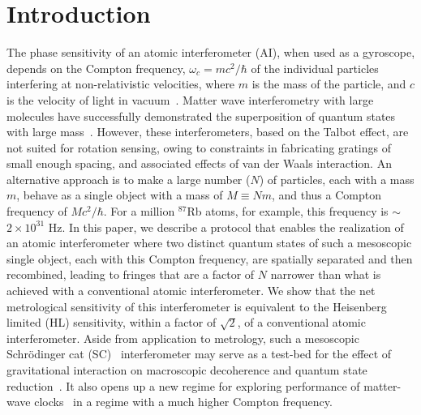 \documentclass[aps,pra,letterpaper,superscriptaddress,showpacs,amsmath,floats,twocolumn]{revtex4-1}
\begin{document}

\section{Introduction}
\label{Introduction}
The phase sensitivity of an atomic interferometer (AI), when used as a gyroscope, depends on the Compton frequency, $\omega_c = mc^2/\hbar$ of the individual particles interfering at non-relativistic velocities, where $m$ is the mass of the particle, and $c$ is the velocity of light in vacuum~\cite{Borde, Chu, Riehle, RefComment}. Matter wave interferometry with large molecules have successfully demonstrated the superposition of quantum states with large mass~\cite{Eibenberger}. However, these interferometers, based on the Talbot effect, are not suited for rotation sensing, owing to constraints in fabricating gratings of small enough spacing, and associated effects of van der Waals interaction. An alternative approach is to make a large number ($N$) of particles, each with a mass $m$, behave as a single object with a mass of $M\equiv Nm$, and thus a Compton frequency of $Mc^2/\hbar$. For a million $^{87}$Rb atoms, for example, this frequency is $\sim$ $2 \times 10^{31}$ Hz. In this paper, we describe a protocol that enables the realization of an atomic interferometer where two distinct quantum states of such a mesoscopic single object, each with this Compton frequency, are spatially separated and then recombined, leading to fringes that are a factor of $N$ narrower than what is achieved with a conventional atomic interferometer. We show that the net metrological sensitivity of this interferometer is equivalent to the Heisenberg limited (HL) sensitivity, within a factor of $\sqrt{2}$, of a conventional atomic interferometer. Aside from application to metrology, such a mesoscopic Schr\"odinger cat (SC)~\cite{Schroedinger} interferometer may serve as a test-bed for the effect of gravitational interaction on macroscopic decoherence and quantum state reduction~\cite{Diosi, Penrose1, Penrose2, Penrose3, Pikovski}. It also opens up a new regime for exploring performance of matter-wave clocks~\cite{Lan} in a regime with a much higher Compton frequency. 
\end{document}
